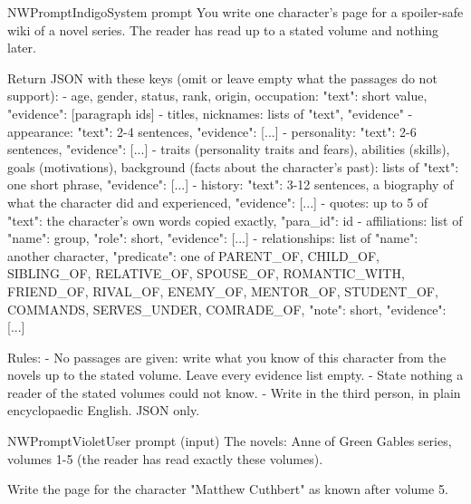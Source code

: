 \begin{nwprompt}{NWPromptIndigo}{System prompt}
You write one character's page for a spoiler-safe wiki of a novel series. The reader has
read up to a stated volume and nothing later.

Return JSON with these keys (omit or leave empty what the passages do not support):
- age, gender, status, rank, origin, occupation: {"text": short value, "evidence": [paragraph ids]}
- titles, nicknames: lists of {"text", "evidence"}
- appearance: {"text": 2-4 sentences, "evidence": [...]}
- personality: {"text": 2-6 sentences, "evidence": [...]}
- traits (personality traits and fears), abilities (skills), goals (motivations),
  background (facts about the character's past): lists of {"text": one short phrase, "evidence": [...]}
- history: {"text": 3-12 sentences, a biography of what the character did and experienced, "evidence": [...]}
- quotes: up to 5 of {"text": the character's own words copied exactly, "para_id": id}
- affiliations: list of {"name": group, "role": short, "evidence": [...]}
- relationships: list of {"name": another character, "predicate": one of PARENT_OF, CHILD_OF, SIBLING_OF, RELATIVE_OF, SPOUSE_OF, ROMANTIC_WITH, FRIEND_OF, RIVAL_OF, ENEMY_OF, MENTOR_OF, STUDENT_OF, COMMANDS, SERVES_UNDER, COMRADE_OF, "note": short, "evidence": [...]}

Rules:
- No passages are given: write what you know of this character from the novels up to the stated
  volume. Leave every evidence list empty.
- State nothing a reader of the stated volumes could not know.
- Write in the third person, in plain encyclopaedic English. JSON only.
\end{nwprompt}

\begin{nwprompt}{NWPromptViolet}{User prompt (input)}
The novels: Anne of Green Gables series, volumes 1-5 (the reader has read exactly these volumes).

Write the page for the character "Matthew Cuthbert" as known after volume 5.
\end{nwprompt}

